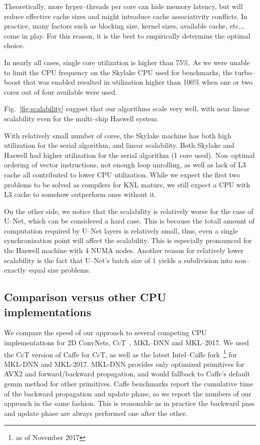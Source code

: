   Theoretically, more hyper--threads per core can hide memory latency,
  but will reduce effective cache sizes and might introduce cache
  associativity conflicts.  In practice, many factors such as blocking
  size, kernel sizes, available cache, etc...  come in play.  For this
  reason, it is the best to empirically determine the optimal choice.

  In nearly all cases, single core utilization is higher than 75\%.
  As we were unable to limit the CPU frequency on the Skylake CPU used
  for benchmarks, the turbo--boost that was enabled resulted in
  utilization higher than 100\% when one or two cores out of four
  available were used.

  Fig.~\ref{fig:scalability} suggest that our algorithms scale very
  well, with near linear scalability even for the multi--chip Haswell
  system.

  With relatively small number of cores, the Skylake machine has both
  high utilization for the serial algorithm, and linear scalability.
  Both Skylake and Haswell had higher utilization for the serial
  algorithm (1 core used).  Non--optimal ordering of vector
  instructions, not enough loop unrolling, as well as lack of L3 cache
  all contributed to lower CPU utilization.  While we expect the first
  two problems to be solved as compilers for KNL mature, we still
  expect a CPU with L3 cache to somehow outperform ones without it.

  On the other side, we notice that the scalability is relatively
  worse for the case of U--Net, which can be considered a hard case.
  This is because the totall amount of computation required by U--Net
  layers is relatively small, thus, even a single synchronization
  point will affect the scalability.  This is especially pronounced
  for the Haswell machine with 4 NUMA nodes.  Another reason for
  relatively lower scalability is the fact that U--Net's batch size of
  $1$ yields a subdivision into non--exactly--equal size problems.

  \subsection{Comparison versus other CPU implementations}

  We compare the speed of our approach to several competing CPU
  implementations for 2D ConvNets, CcT~\cite{hadjis2015shallow},
  MKL--DNN and MKL--2017.  We used the CcT version of Caffe for CcT,
  as well as the latest Intel--Caffe fork~\footnote{as of November
    2017} for MKL-DNN and MKL-2017.  MKL-DNN provides only optimized
  primitives for AVX2 and forward/backward propagation, and would
  fallback to Caffe's default gemm method for other primitives.  Caffe
  benchmarks report the cumulative time of the backward propagation
  and update phase, so we report the numbers of our approach in the
  same fashion.  This is reasonable as in practice the backward pass
  and update phase are always performed one after the other.


